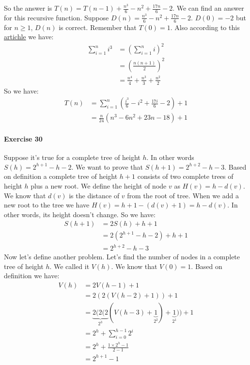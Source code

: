 \documentclass{book}
\begin{document}
	So the answer is $T(n) = T(n - 1) + \frac{n^3}{6} - n^2 + \frac{17n}{6} - 2$. We can find an answer for this recursive function. Suppose $D(n) = \frac{n^3}{6} - n^2 + \frac{17n}{6} - 2$. $D(0) = -2$ but for $n \ge 1$, $D(n)$ is correct. Remember that $T(0) = 1$. Also according to this \href{https://en.wikipedia.org/wiki/Squared_triangular_number}{artichle} we have:
	\begin{equation*}
		\begin{split}
			\sum_{i = 1}^{n}{i^3} &= (\sum_{i = 1}^{n}{i})^2 \\
			&= (\frac{n(n + 1)}{2})^2 \\
			&= \frac{n^4}{4} + \frac{n^3}{3} + \frac{n^2}{2}
		\end{split}
	\end{equation*}
	So we have:
	\begin{equation*}
		\begin{split}
			T(n) &= \sum_{i = 1}^{n}{(\frac{i^3}{6} - i^2 + \frac{17i}{6} - 2)} + 1 \\
			&= \frac{n}{24}(n^3 - 6n^2 +23n - 18) + 1
		\end{split}
	\end{equation*}
	\paragraph{Exercise 30} Suppose it's true for a complete tree of height $h$. In other words $S(h) = 2^{h + 1} - h - 2$. We want to prove that $S(h + 1) = 2^{h + 2} - h - 3$. Based on definition a complete tree of height $h + 1$ consists of two complete trees of height $h$ plus a new root. We define the height of node $v$ as $H(v) = h - d(v)$. We know that $d(v)$ is the distance of $v$ from the root of tree. When we add a new root to the tree we have $H(v) = h + 1 - (d(v) + 1) = h - d(v)$. In other words, its height doesn't change. So we have:
	\begin{equation*}
		\begin{split}
			S(h + 1) &= 2S(h) + h + 1 \\
			&= 2(2^{h + 1} - h - 2) + h + 1 \\
			&= 2^{h + 2} - h - 3
		\end{split}
	\end{equation*}
	Now let's define another problem. Let's find the number of nodes in a complete tree of height $h$. We called it $V(h)$. We know that $V(0) = 1$. Based on definition we have:
	\begin{equation*}
		\begin{split}
			V(h) &= 2V(h - 1) + 1 \\
			&= 2(2(V(h - 2) + 1)) + 1 \\
			&= \underbrace{2(2(2}_{2^3}(V(h - 3) + \underbrace{1}_{2^2}) + \underbrace{1}_{2^1})) + 1 \\
			&= 2^h + \sum_{i = 0}^{h - 1}{2^i} \\
			&= 2^h + \frac{1 \times 2^{h} - 1}{2 - 1} \\
			&= 2^{h + 1} - 1
		\end{split}
	\end{equation*}
\end{document}

